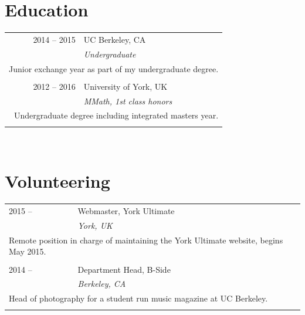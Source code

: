 \documentclass[10pt]{article}
\begin{document}
\begin{minipage}[t]{0.35\textwidth}
\vspace{0pt}

\section{Education}

\hspace{-6pt}\begin{tabularx}{\linewidth}{rX}

2014 -- 2015 & \hspace{6pt} {UC Berkeley, CA} \\
& \hspace{6pt} \small{\textit{Undergraduate}} \\
\multicolumn{2}{p{\linewidth}}{Junior exchange year as part of my undergraduate degree. }\\
\\

2012 -- 2016 & \hspace{6pt}  {University of York, UK} \\
&\hspace{6pt}  \small{\textit{MMath, 1st class honors}}\\
\multicolumn{2}{p{\linewidth}}{Undergraduate degree including integrated masters year.} \\
\\
\end{tabularx}\\

\section{Volunteering}

\hspace{-6pt}\begin{tabularx}{\linewidth}{lX}
2015 --  & {Webmaster, York Ultimate} \\
& \small{\textit{York, UK}} \\
\multicolumn{2}{p{\linewidth}}{Remote position in charge of maintaining the York Ultimate website, begins May 2015. }\\
\\

2014 --  & {Department Head, B-Side} \\
& \small{\textit{Berkeley, CA}} \\
\multicolumn{2}{p{\linewidth}}{Head of photography for a student run music magazine at UC Berkeley. }\\
\\


\end{tabularx}
\end{minipage}
\end{document}
